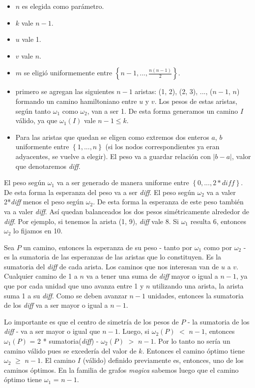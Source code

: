 \begin{itemize}
\begin{itemize}
    \item $n$ es elegida como parámetro.
    \item $k$ vale $n-1$.
    \item $u$ vale 1.
    \item $v$ vale $n$.
    \item $m$ se eligió uniformemente entre $\left\{{n-1, ..., \frac{n(n-1)}{2}}\right\}$.
    \item primero se agregan las siguientes $n-1$ aristas: (1, 2), (2, 3), ..., ($n-1$, $n$) formando un camino hamiltoniano entre $u$ y $v$. Los pesos de estas aristas, según tanto $\omega_1$ como $\omega_2$, van a ser 1. De esta forma generamos un camino $I$ válido, ya que $\omega_1(I)$ vale $n-1 \leq k$.
    \item Para las aristas que quedan se eligen como extremos dos enteros $a$, $b$ uniformente entre $\left\{{1, ..., n}\right\}$ (si los nodos correspondientes ya eran adyacentes, se vuelve a elegir). El peso va a guardar relación con $|b-a|$, valor que denotaremos \textit{diff}.
\end{itemize}
\end{itemize}

El peso según $\omega_1$ va a ser generado de manera uniforme entre $\left\{{0, ..., 2*diff}\right\}$. De esta forma la esperanza del peso va a ser \textit{diff}. El peso según $\omega_2$ va a valer 2*\textit{diff} menos el peso según $\omega_2$. De esta forma la esperanza de este peso también va a valer \textit{diff}. Así quedan balanceados los dos pesos simétricamente alrededor de \textit{diff}. Por ejemplo, si tenemos la arista (1, 9), \textit{diff} vale 8. Si $\omega_1$ resulta 6, entonces $\omega_2$ lo fijamos en 10.

Sea $P$ un camino, entonces la esperanza de su peso - tanto por $\omega_1$ como por $\omega_2$ - es la sumatoria de las esperanzas de las aristas que lo constituyen. Es la sumatoria del \textit{diff} de cada arista. Los caminos que nos interesan van de $u$ a $v$. Cualquier camino de 1 a $n$  va a tener una suma de \textit{diff} mayor o igual a $n-1$, ya que por cada unidad que uno avanza entre 1 y $n$ utilizando una arista, la arista suma 1 a su \textit{diff}. Como se deben avanzar $n-1$ unidades, entonces la sumatoria de los \textit{diff} va a ser mayor o igual a $n-1$.

Lo importante es que el centro de simetría de los pesos de $P$ - la sumatoria de los \textit{diff} - va a ser mayor o igual que $n-1$. Luego, si $\omega_2(P)$ $<$ $n-1$, entonces $\omega_1(P)$ = 2 * sumatoria(\textit{diff}) - $\omega_2(P)$ $>$ $n-1$. Por lo tanto no sería un camino válido pues se excedería del valor de $k$. Entonces el camino óptimo tiene $\omega_2$ $\geq$ $n-1$. El camino $I$ (válido) definido previamente es, entonces, uno de los caminos óptimos. En la familia de grafos \textit{magica} sabemos luego que el camino óptimo tiene $\omega_1$ = $n-1$.

